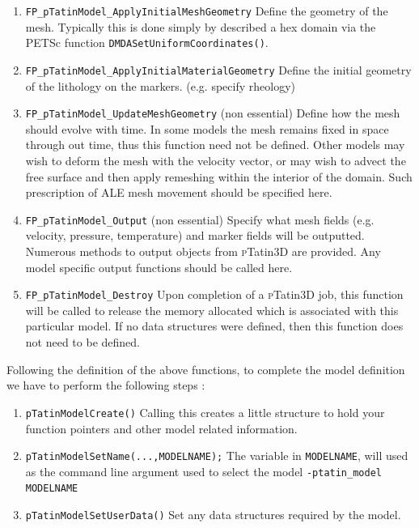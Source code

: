 \documentclass[paper=a4, fontsize=11pt,twoside]{scrartcl}
\newcommand{\ptat}{{{\textsc pTatin3D}}}
\newcommand{\unix}[1]{\texttt{\footnotesize #1}}
\begin{document}
{{\begin{enumerate}
	\item \unix{FP\_pTatinModel\_ApplyInitialMeshGeometry}
	Define the geometry of the mesh. Typically this is done simply by described a hex domain via the PETSc function \unix{DMDASetUniformCoordinates()}.

	\item \unix{FP\_pTatinModel\_ApplyInitialMaterialGeometry}
	Define the initial geometry of the lithology on the markers. (e.g. specify rheology)

	\item \unix{FP\_pTatinModel\_UpdateMeshGeometry} (non essential)
	Define how the mesh should evolve with time. In some models the mesh remains fixed in space through out time, thus this function need not be defined. Other models may wish to deform the mesh with the velocity vector, or may wish to advect the free surface and then apply remeshing within the interior of the domain. Such prescription of ALE mesh movement should be specified here.

	\item \unix{FP\_pTatinModel\_Output} (non essential)
	Specify what mesh fields (e.g. velocity, pressure, temperature) and marker fields will be outputted. Numerous
	methods to output objects from {\ptat} are provided. Any model specific output functions should be called here.

	\item \unix{FP\_pTatinModel\_Destroy} 
	Upon completion of a {\ptat} job, this function will be called to release the memory allocated which is associated 
	with this particular model. If no data structures were defined, then this function does not need to be defined.
\end{enumerate}

Following the definition of the above functions, to complete the model definition we have to perform the following steps :
\begin{enumerate}
	\item \unix{pTatinModelCreate()}
Calling this creates a little structure to hold your function pointers and other model related information.

	\item \unix{pTatinModelSetName(...,MODELNAME);}
The variable in \unix{MODELNAME}, will used as the command line argument used to select the model
	\unix{-ptatin\_model MODELNAME}

	\item \unix{pTatinModelSetUserData()}
Set any data structures required by the model.


\end{enumerate}}}
\end{document}
